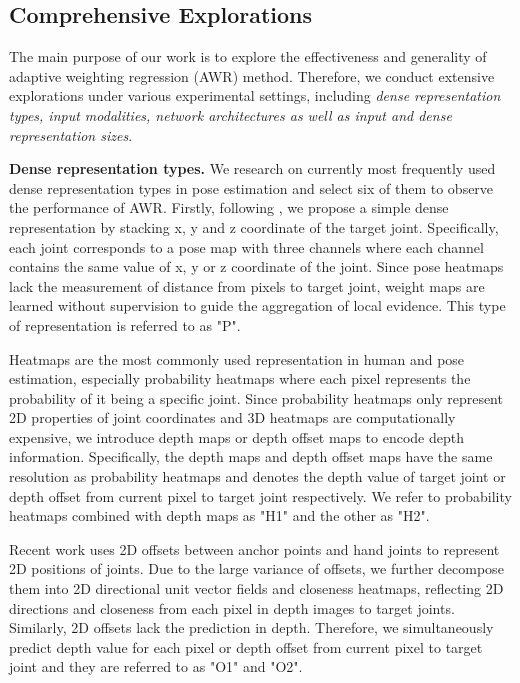 \documentclass[letterpaper]{article} \usepackage{aaai20}  \usepackage{times}  \usepackage{helvet} \usepackage{courier}  \usepackage[hyphens]{url}  \usepackage{graphicx} \usepackage{amsmath}
\begin{document}
\parskip=0pt

\subsection{Comprehensive Explorations}
The main purpose of our work is to explore the effectiveness and generality of adaptive weighting regression (AWR) method. Therefore, we conduct extensive explorations under various experimental settings, including \textit{dense representation types, input modalities, network architectures as well as input and dense representation sizes}. 

\parskip=0pt

\textbf{Dense representation types.} We research on currently most frequently used dense representation types in pose estimation and select six of them to observe the performance of AWR. Firstly, following \cite{point2pose}, we propose a simple dense representation by stacking x, y and z coordinate of the target joint. Specifically, each joint corresponds to a pose map with three channels where each channel contains the same value of x, y or z coordinate of the joint. Since pose heatmaps lack the measurement of distance from pixels to target joint, weight maps are learned without supervision to guide the aggregation of local evidence. This type of representation is referred to as "P".

Heatmaps are the most commonly used representation in human and pose estimation, especially probability heatmaps where each pixel represents the probability of it being a specific joint. Since probability heatmaps only represent 2D properties of joint coordinates and 3D heatmaps are computationally expensive, we introduce depth maps or depth offset maps to encode depth information. Specifically, the depth maps and depth offset maps have the same resolution as probability heatmaps and denotes the depth value of target joint or depth offset from current pixel to target joint respectively. We refer to probability heatmaps combined with depth maps as "H1" and the other as "H2". 

Recent work \cite{a2j} uses 2D offsets between anchor points and hand joints to represent 2D positions of joints. Due to the large variance of offsets, we further decompose them into 2D directional unit vector fields and closeness heatmaps, reflecting 2D directions and closeness from each pixel in depth images to target joints. Similarly, 2D offsets lack the prediction in depth. Therefore, we simultaneously predict depth value for each pixel or depth offset from current pixel to target joint and they are referred to as "O1" and "O2". 
\end{document}
